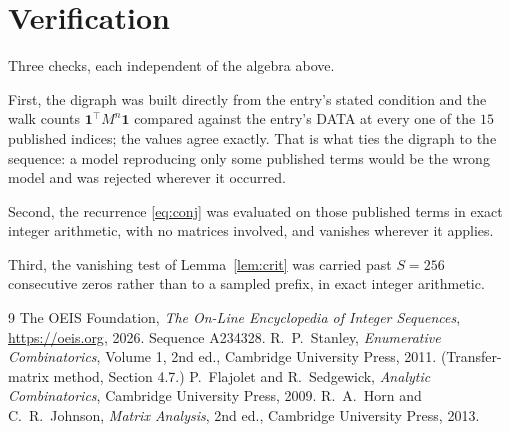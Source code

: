\documentclass[11pt,a4paper]{article}
\theoremstyle{plain}
\theoremstyle{definition}
\begin{document}
\section{Verification}

Three checks, each independent of the algebra above.

First, the digraph was built directly from the entry's stated condition and the walk counts
$\mathbf{1}^{\!\top}M^{n}\mathbf{1}$ compared against the entry's DATA at every one of
the $15$ published indices; the values agree exactly. That is what ties the digraph to
the sequence: a model reproducing only some published terms would be the wrong model and
was rejected wherever it occurred.

Second, the recurrence \eqref{eq:conj} was evaluated on those published terms in exact
integer arithmetic, with no matrices involved, and vanishes wherever it applies.

Third, the vanishing test of Lemma~\ref{lem:crit} was carried past $S=256$ consecutive
zeros rather than to a sampled prefix, in exact integer arithmetic.

\begin{thebibliography}{9}
 The OEIS Foundation, \emph{The On-Line Encyclopedia of Integer
Sequences}, \url{https://oeis.org}, 2026. Sequence A234328.
 R.~P.~Stanley, \emph{Enumerative Combinatorics}, Volume 1, 2nd ed.,
Cambridge University Press, 2011. (Transfer-matrix method, Section 4.7.)
 P.~Flajolet and R.~Sedgewick, \emph{Analytic Combinatorics}, Cambridge
University Press, 2009.
 R.~A.~Horn and C.~R.~Johnson, \emph{Matrix Analysis}, 2nd ed., Cambridge
University Press, 2013.
\end{thebibliography}
\end{document}
